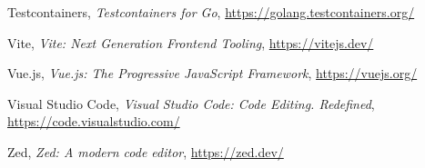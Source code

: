 \documentclass[11pt,a4paper]{article}
\begin{document}
\begin{thebibliography}{9}
Testcontainers, \emph{Testcontainers for Go}, \url{https://golang.testcontainers.org/}

Vite, \emph{Vite: Next Generation Frontend Tooling}, \url{https://vitejs.dev/}

Vue.js, \emph{Vue.js: The Progressive JavaScript Framework}, \url{https://vuejs.org/}

Visual Studio Code, \emph{Visual Studio Code: Code Editing. Redefined}, \url{https://code.visualstudio.com/}

Zed, \emph{Zed: A modern code editor}, \url{https://zed.dev/}

\end{thebibliography}
\end{document}
